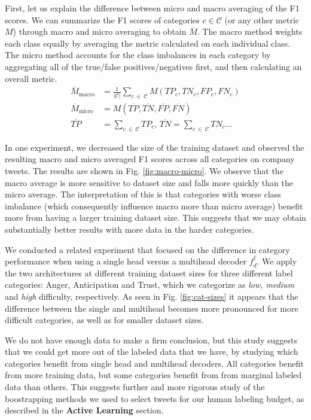 \documentclass[letterpaper]{article} \usepackage{aaai19}  \usepackage{times}  \usepackage{helvet}  \usepackage{courier}  \usepackage{url}  \usepackage{graphicx}  \usepackage{booktabs}
\begin{document}
First, let us explain the difference between micro and macro averaging of the F1 scores. We can summarize the F1 scores of categories $c \in \mathcal{C}$ (or any other metric $M$) through macro and micro averaging to obtain $\overline{M}$. The macro method weights each class equally by averaging the metric calculated on each individual class. The micro method accounts for the class imbalances in each category by aggregating all of the true/false positives/negatives first, and then calculating an overall metric. 
\begin{align*}
\overline{M}_{\text{macro}} &= \frac{1}{|\mathcal{C}|} \sum_{c \: \in \: \mathcal{C}} M(TP_c, TN_c, FP_c, FN_c) \\
\overline{M}_{\text{micro}} &= M(\overline{TP}, \overline{TN}, \overline{FP}, \overline{FN}) \\
\overline{TP} &= \sum_{c \: \in \: \mathcal{C}} TP_c, \,  \overline{TN} = \sum_{c \: \in \: \mathcal{C}} TN_c\ldots
\end{align*}

In one experiment, we decreased the size of the training dataset and observed the resulting macro and micro averaged F1 scores across all categories on company tweets. The results are shown in Fig. \ref{fig:macro-micro}. We observe that the macro average is more sensitive to dataset size and falls more quickly than the micro average. The interpretation of this is that categories with worse class imbalance (which consequently influence macro more than micro average) benefit more from having a larger training dataset size. This suggests that we may obtain substantially better results with more data in the harder categories.

We conducted a related experiment that focused on the difference in category performance when using a single head versus a multihead decoder $f_d^{\dagger}$. We apply the two architectures at different training dataset sizes  for three different label categories: Anger, Anticipation and Trust, which we categorize as \textit{low, medium} and \textit{high} difficulty, respectively. As seen in Fig. \ref{fig:cat-sizes} it appears that the difference between the single and multihead becomes more pronounced for more difficult categories, as well as for smaller dataset sizes. 

We do not have enough data to make a firm conclusion, but this study suggests that we could get more out of the labeled data that we have, by studying which categories benefit from single head and multihead decoders. All categories benefit from more training data, but some categories benefit from from marginal labeled data than others. This suggests further and more rigorous study of the boostrapping methods we used to select tweets for our human labeling budget, as described in the \textbf{Active Learning} section.
\end{document}
